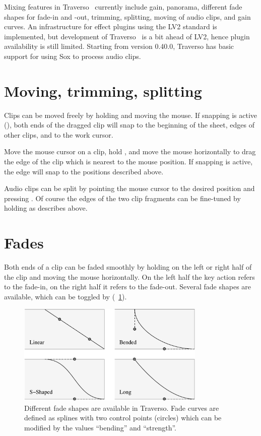 Mixing features in Traverso \Version\ currently include gain, panorama, different fade shapes for fade-in and -out, trimming, splitting, moving of audio clips, and gain curves. An infrastructure for effect plugins using the LV2 standard is implemented, but development of Traverso \Version\ is a bit ahead of LV2, hence plugin availability is still limited. Starting from version 0.40.0, Traverso has basic support for using Sox to process audio clips.

\section{Moving, trimming, splitting}
Clips can be moved freely by holding  and moving the mouse. If snapping is active (), both ends of the dragged clip will snap to the beginning of the sheet, edges of other clips, and to the work cursor.

Move the mouse cursor on a clip, hold , and move the mouse horizontally to drag the edge of the clip which is nearest to the mouse position. If snapping is active, the edge will snap to the positions described above.

Audio clips can be split by pointing the mouse cursor to the desired position and pressing . Of course the edges of the two clip fragments can be fine-tuned by holding  as describes above.

\section{Fades}
Both ends of a clip can be faded smoothly by holding  on the left or right half of the clip and moving the mouse horizontally. On the left half the key action refers to the fade-in, on the right half it refers to the fade-out. Several fade shapes are available, which can be toggled by  (\FigB~\ref{fig_fades01}).

\begin{figure}[t]
 \centering\includegraphics[width=0.8\textwidth]{images/fades}
 \caption{Different fade shapes are available in Traverso. Fade curves are defined as splines with two control points (circles) which can be modified by the values ``bending'' and ``strength''.}
 \label{fig_fades01}
\end{figure}

